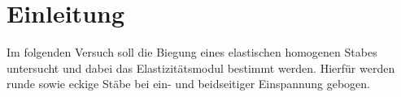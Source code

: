 \section{Einleitung}
\label{sec:einleitung}
Im folgenden Versuch soll die Biegung eines elastischen homogenen Stabes untersucht
und dabei das Elastizitätsmodul bestimmt werden. Hierfür werden runde sowie eckige Stäbe
bei ein- und beidseitiger Einspannung gebogen.
